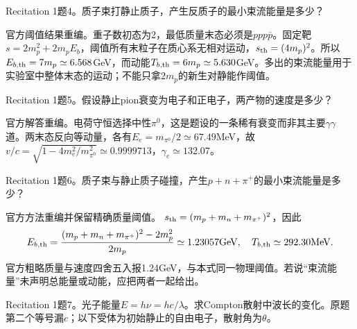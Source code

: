 \begin{exercise}\label{ex:rec-1-4}
Recitation 1题4。质子束打静止质子，产生反质子的最小束流能量是多少？
\end{exercise}
\begin{solution}
官方阈值结果重编。重子数初态为2，最低质量末态必须是$ppp\bar p$。固定靶$s=2m_p^2+2m_pE_b$，阈值所有末粒子在质心系无相对运动，$s_{\rm th}=(4m_p)^2$。所以$E_{b,\rm th}=7m_p\simeq6.568$GeV，而动能$T_{b,\rm th}=6m_p\simeq5.630$GeV。多出的束流能量用于实验室中整体末态的运动；不能只拿$2m_p$的新生对静能作阈值。
\end{solution}
\begin{exercise}\label{ex:rec-1-5}
Recitation 1题5。假设静止pion衰变为电子和正电子，两产物的速度是多少？
\end{exercise}
\begin{solution}
官方解答重编。电荷守恒选择中性$\pi^0$，这是题设的一条稀有衰变而非其主要$\gamma\gamma$道。两末态反向等动量，各有$E_e=m_{\pi^0}/2\simeq67.49$MeV，故
$v/c=\sqrt{1-4m_e^2/m_{\pi^0}^2}\simeq0.9999713$，$\gamma_e\simeq132.07$。
\end{solution}
\begin{exercise}\label{ex:rec-1-6}
Recitation 1题6。质子束与静止质子碰撞，产生$p+n+\pi^+$的最小束流能量是多少？
\end{exercise}
\begin{solution}
官方方法重编并保留精确质量阈值。
$s_{\rm th}=(m_p+m_n+m_{\pi^+})^2$，因此
\begin{equation}
 E_{b,\rm th}=\frac{(m_p+m_n+m_{\pi^+})^2-2m_p^2}{2m_p}
 \simeq1.23057\mathrm{GeV},\quad T_{b,\rm th}\simeq292.30\mathrm{MeV}.
\end{equation}
官方粗略质量与速度四舍五入报1.24GeV，与本式同一物理阈值。若说“束流能量”未声明总能量或动能，应把两者一起给出。
\end{solution}
\begin{exercise}\label{ex:rec-1-7}
Recitation 1题7。光子能量$E=h\nu=hc/\lambda$。求Compton散射中波长的变化。原题第二个等号漏$c$；以下受体为初始静止的自由电子，散射角为$\theta$。
\end{exercise}
\begin{center}\end{center}
